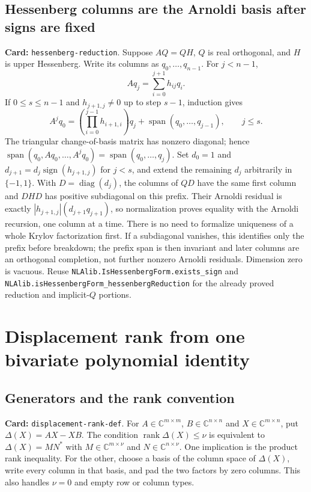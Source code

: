 \documentclass[11pt,a4paper]{article}
\newcommand{\C}{\mathbb C}
\DeclareMathOperator{\diag}{diag}
\DeclareMathOperator{\rank}{rank}
\DeclareRobustCommand{\code}[1]{{\footnotesize\urlstyle{tt}\nolinkurl{#1}}}
\begin{document}
\subsection{Hessenberg columns are the Arnoldi basis after signs are fixed}
\label{route:hessenberg-reduction}
\textbf{Card:} \code{hessenberg-reduction}.
Suppose $AQ=QH$, $Q$ is real orthogonal, and $H$ is upper Hessenberg.
Write its columns as $q_0,\ldots,q_{n-1}$. For $j<n-1$,
\[
 Aq_j=\sum_{i=0}^{j+1}h_{ij}q_i.
\]
If $0\le s\le n-1$ and $h_{j+1,j}\ne0$ up to step $s-1$, induction gives
\[
 A^jq_0=\left(\prod_{i=0}^{j-1}h_{i+1,i}\right)q_j
       +\operatorname{span}(q_0,\ldots,q_{j-1}),\qquad j\le s.
\]
The triangular change-of-basis matrix has nonzero diagonal; hence
$\operatorname{span}(q_0,Aq_0,\ldots,A^jq_0)
=\operatorname{span}(q_0,\ldots,q_j)$.
Set $d_0=1$ and $d_{j+1}=d_j\operatorname{sign}(h_{j+1,j})$ for
$j<s$, and extend the remaining $d_j$ arbitrarily in $\{-1,1\}$.
With $D=\diag(d_j)$, the columns of $QD$ have the same first column and
$DHD$ has positive subdiagonal on this prefix. Their Arnoldi residual is exactly
$|h_{j+1,j}|(d_{j+1}q_{j+1})$, so normalization proves equality with the
Arnoldi recursion, one column at a time. There is no need to formalize
uniqueness of a whole Krylov factorization first.
If a subdiagonal vanishes, this identifies only the prefix before breakdown;
the prefix span is then invariant and later columns are an orthogonal
completion, not further nonzero Arnoldi residuals. Dimension zero is vacuous.
Reuse \code{NLAlib.IsHessenbergForm.exists_sign} and
\code{NLAlib.isHessenbergForm_hessenbergReduction} for the already proved
reduction and implicit-$Q$ portions.

\section{Displacement rank from one bivariate polynomial identity}
\subsection{Generators and the rank convention}
\label{route:displacement-rank-def}
\textbf{Card:} \code{displacement-rank-def}.
For $A\in\C^{m\times m}$, $B\in\C^{n\times n}$ and $X\in\C^{m\times n}$,
put $\Delta(X)=AX-XB$. The condition $\rank\Delta(X)\le\nu$ is equivalent
to $\Delta(X)=MN^*$ with $M\in\C^{m\times\nu}$ and
$N\in\C^{n\times\nu}$. One implication is the product rank inequality.
For the other, choose a basis of the column space of $\Delta(X)$,
write every column in that basis, and pad the two factors by zero columns.
This also handles $\nu=0$ and empty row or column types.
\end{document}
